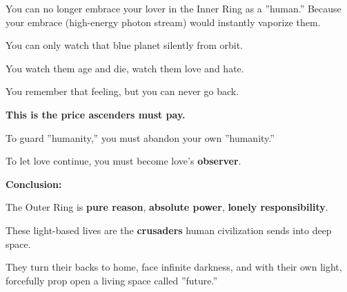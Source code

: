 You can no longer embrace your lover in the Inner Ring as a ''human.'' Because your embrace (high-energy photon stream) would instantly vaporize them.

You can only watch that blue planet silently from orbit.

You watch them age and die, watch them love and hate.

You remember that feeling, but you can never go back.

\textbf{This is the price ascenders must pay.}

To guard ''humanity,'' you must abandon your own ''humanity.''

To let love continue, you must become love's \textbf{observer}.

\textbf{Conclusion:}

The Outer Ring is \textbf{pure reason}, \textbf{absolute power}, \textbf{lonely responsibility}.

These light-based lives are the \textbf{crusaders} human civilization sends into deep space.

They turn their backs to home, face infinite darkness, and with their own light, forcefully prop open a living space called ''future.''

